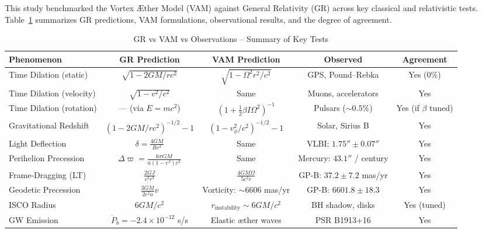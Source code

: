 \documentclass[a4paper, aps,preprint,superscriptaddress, 12pt]{revtex4}
\begin{document}
This study benchmarked the Vortex Æther Model (VAM) against General Relativity (GR) across key classical and relativistic tests. Table~\ref{tab:summary_comparison} summarizes GR predictions, VAM formulations, observational results, and the degree of agreement.

\begin{table}[h]
    \centering
    \footnotesize
    \caption{GR vs VAM vs Observations – Summary of Key Tests}
    \label{tab:summary_comparison}
    \begin{tabular}{|l|c|c|c|c|}
        \hline
        \textbf{Phenomenon} & \textbf{GR Prediction} & \textbf{VAM Prediction} & \textbf{Observed} & \textbf{Agreement} \\
        \hline
        Time Dilation (static) & \( \sqrt{1 - 2GM/rc^2} \) & \( \sqrt{1 - \Omega^2 r^2/c^2} \) & GPS, Pound–Rebka & Yes (0\%) \\
        Time Dilation (velocity) & \( \sqrt{1 - v^2/c^2} \) & Same & Muons, accelerators & Yes \\
        Time Dilation (rotation) & — (via \( E=mc^2 \)) & \( \left(1 + \frac{1}{2}\beta I \Omega^2 \right)^{-1} \) & Pulsars (\(\sim 0.5\%\)) & Yes (if \( \beta \) tuned) \\
        Gravitational Redshift & \( (1 - 2GM/rc^2)^{-1/2} - 1 \) & \( (1 - v_\phi^2/c^2)^{-1/2} - 1 \) & Solar, Sirius B & Yes \\
        Light Deflection & \( \delta = \frac{4GM}{Rc^2} \) & Same & VLBI: \(1.75'' \pm 0.07''\) & Yes \\
        Perihelion Precession & \( \Delta \varpi = \frac{6\pi GM}{a(1-e^2)c^2} \) & Same & Mercury: \(43.1''\) / century & Yes \\
        Frame-Dragging (LT) & \( \frac{2GJ}{c^2 r^3} \) & \( \frac{4GM\Omega}{5c^2 r} \) & GP-B: \(37.2 \pm 7.2\) mas/yr & Yes \\
        Geodetic Precession & \( \frac{3GM}{2c^2 a} v \) & Vorticity: \( \sim 6606 \) mas/yr & GP-B: \(6601.8 \pm 18.3\) & Yes \\
        ISCO Radius & \( 6GM/c^2 \) & \( r_\text{instability} \sim 6GM/c^2 \) & BH shadow, disks & Yes (tuned) \\
        GW Emission & \( \dot{P}_b = -2.4 \times 10^{-12} \) s/s & Elastic æther waves & PSR B1913+16 & Yes \\
        \hline
    \end{tabular}
\end{table}


\vspace{1em}
\end{document}
